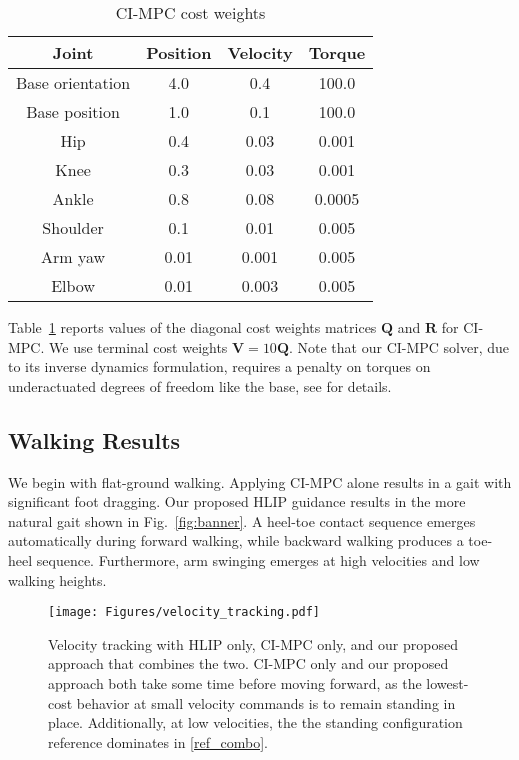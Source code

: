 \begin{table}
    \centering
    \begin{tabular}{c|c c c}
         \textbf{Joint} & \textbf{Position} & \textbf{Velocity} & \textbf{Torque}  \\
         \hline
         Base orientation & 4.0 & 0.4 & 100.0 \\
         Base position & 1.0 & 0.1 & 100.0 \\
         Hip & 0.4 & 0.03 & 0.001 \\
         Knee & 0.3 & 0.03 & 0.001 \\
         Ankle & 0.8 & 0.08 & 0.0005 \\
         Shoulder & 0.1 & 0.01 & 0.005 \\
         Arm yaw & 0.01 & 0.001 & 0.005 \\
         Elbow & 0.01 & 0.003 & 0.005 \\
    \end{tabular}
    \caption{CI-MPC cost weights}
    \label{tab:mpc_weights}
\end{table}


Table~\ref{tab:mpc_weights} reports values of the diagonal cost weights matrices $\bm Q$ and $\bm R$ for CI-MPC. We use terminal cost weights $\bm V = 10 \bm Q$. Note that our CI-MPC solver, due to its inverse dynamics formulation, requires a penalty on torques on underactuated degrees of freedom like the base, see \cite{kurtz2023inverse} for details.

\subsection{Walking Results}
We begin with flat-ground walking. Applying CI-MPC alone results in a gait with significant foot dragging. Our proposed HLIP guidance results in the more natural gait shown in Fig.~\ref{fig:banner}. A heel-toe contact sequence emerges automatically during forward walking, while backward walking produces a toe-heel sequence. Furthermore, arm swinging emerges at high velocities and low walking heights.

\begin{figure} 
    \centering
    \texttt{[image: Figures/velocity\_tracking.pdf]}
    \caption{Velocity tracking with HLIP only, CI-MPC only, and our proposed approach that combines the two. CI-MPC only and our proposed approach both take some time before moving forward, as the lowest-cost behavior at small velocity commands is to remain standing in place. Additionally, at low velocities, the the standing configuration reference dominates in \eqref{ref_combo}.}
    \label{fig:velocity_tracking}
    \vspace{-20pt} 
\end{figure}

